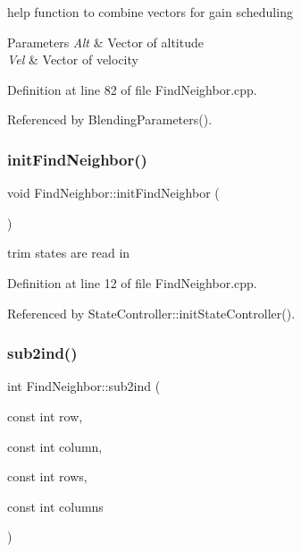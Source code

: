 help function to combine vectors for gain scheduling 


\begin{DoxyParams}{Parameters}
{\em Alt} & Vector of altitude \\
\hline
{\em Vel} & Vector of velocity \\
\hline
\end{DoxyParams}


Definition at line 82 of file Find\+Neighbor.\+cpp.



Referenced by Blending\+Parameters().

\mbox{\label{class_find_neighbor_a749dad6095d8e0e62dd5ba11abdd7500}} 
\subsubsection{\texorpdfstring{init\+Find\+Neighbor()}{initFindNeighbor()}}
{\footnotesize\ttfamily void Find\+Neighbor\+::init\+Find\+Neighbor (\begin{DoxyParamCaption}{ }\end{DoxyParamCaption})}



trim states are read in 



Definition at line 12 of file Find\+Neighbor.\+cpp.



Referenced by State\+Controller\+::init\+State\+Controller().

\mbox{\label{class_find_neighbor_a83acfbd061084dd8e8fa6e1ceaabab52}} 
\subsubsection{\texorpdfstring{sub2ind()}{sub2ind()}}
{\footnotesize\ttfamily int Find\+Neighbor\+::sub2ind (\begin{DoxyParamCaption}\item[{const int}]{row,  }\item[{const int}]{column,  }\item[{const int}]{rows,  }\item[{const int}]{columns }\end{DoxyParamCaption})}



